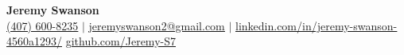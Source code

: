 \documentclass[letterpaper, 10pt]{article}
\begin{document}
\begin{center}
    \textbf{\Huge Jeremy Swanson} \\ \vspace{1pt}
    \small \href{tel:14076008235}{\underline{(407) 600-8235}} $|$
    \small \href{mailto:jeremyswanson2@gmail.com}{\underline{jeremyswanson2@gmail.com}} $|$
    \href{https://www.linkedin.com/in/jeremy-swanson-4560a1293/}
        {\underline{linkedin.com/in/jeremy-swanson-4560a1293/}}
    \href{https://www.github.com/Jeremy-S7}{\underline{github.com/Jeremy-S7}}
\end{center}





\end{document}
